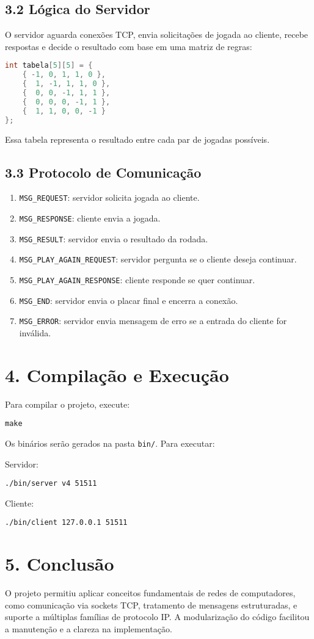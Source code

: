 \documentclass[a4paper,12pt]{article}
\begin{document}
\subsection*{3.2 Lógica do Servidor}
O servidor aguarda conexões TCP, envia solicitações de jogada ao cliente, recebe respostas e decide o resultado com base em uma matriz de regras:

\begin{lstlisting}[language=C]
int tabela[5][5] = {
    { -1, 0, 1, 1, 0 },
    {  1, -1, 1, 1, 0 },
    {  0, 0, -1, 1, 1 },
    {  0, 0, 0, -1, 1 },
    {  1, 1, 0, 0, -1 }
};
\end{lstlisting}

Essa tabela representa o resultado entre cada par de jogadas possíveis.

\subsection*{3.3 Protocolo de Comunicação}
\begin{enumerate}
    \item \texttt{MSG\_REQUEST}: servidor solicita jogada ao cliente.
    \item \texttt{MSG\_RESPONSE}: cliente envia a jogada.
    \item \texttt{MSG\_RESULT}: servidor envia o resultado da rodada.
    \item \texttt{MSG\_PLAY\_AGAIN\_REQUEST}: servidor pergunta se o cliente deseja continuar.
    \item \texttt{MSG\_PLAY\_AGAIN\_RESPONSE}: cliente responde se quer continuar.
    \item \texttt{MSG\_END}: servidor envia o placar final e encerra a conexão.
    \item \texttt{MSG\_ERROR}: servidor envia mensagem de erro se a entrada do cliente for inválida.
\end{enumerate}

\section*{4. Compilação e Execução}
Para compilar o projeto, execute:
\begin{verbatim}
make
\end{verbatim}
Os binários serão gerados na pasta \texttt{bin/}. Para executar:

Servidor:
\begin{verbatim}
./bin/server v4 51511
\end{verbatim}

Cliente:
\begin{verbatim}
./bin/client 127.0.0.1 51511
\end{verbatim}

\section*{5. Conclusão}
O projeto permitiu aplicar conceitos fundamentais de redes de computadores, como comunicação via sockets TCP, tratamento de mensagens estruturadas, e suporte a múltiplas famílias de protocolo IP. A modularização do código facilitou a manutenção e a clareza na implementação.
\end{document}
